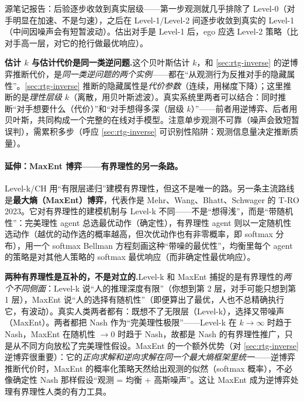 \noindent 源笔记报告：后验逐步收敛到真实层级——第一步观测就几乎排除了 Level-0（对手明显在加速、不是匀速），之后在 Level-1/Level-2 间逐步收敛到真实的 Level-1（中间因噪声会有短暂波动）\cite{camerer2004cognitive}。估出对手是 Level-1 后，ego 应选 Level-2 策略（比对手高一层，对它的抢行做最优响应）。

\begin{insight}
\textbf{估计 $k$ 与估计代价是同一类逆问题.}\;这个贝叶斯估计 $k$，和 \cref{sec:rtg-inverse} 的逆博弈推断代价，是\emph{同一类逆问题的两个实例}——都在“从观测行为反推对手的隐藏属性”。\cref{sec:rtg-inverse} 推断的隐藏属性是\emph{代价参数}（连续，用梯度下降）；这里推断的是\emph{理性层级 $k$}（离散，用贝叶斯滤波）。真实系统里两者可以结合：同时推断“对手想要什么（代价）”和“对手想得多深（层级 $k$）”——前者用逆博弈、后者用贝叶斯，共同构成一个完整的在线对手模型。注意单步观测不可靠（噪声会致短暂误判），需累积多步（呼应 \cref{sec:rtg-inverse} 可识别性陷阱：观测信息量决定推断质量）。
\end{insight}

\paragraph{延伸：MaxEnt 博弈——有界理性的另一条路。}
Level-k/CH 用“有限层递归”建模有界理性，但这不是唯一的路。另一条主流路线是\textbf{最大熵（MaxEnt）博弈}，代表作是 Mehr、Wang、Bhatt、Schwager 的 T-RO 2023\cite{mehr2023maximum}。它对有界理性的建模机制与 Level-k 不同——不是“想得浅”，而是“带随机性”：完美理性 agent 总选最优动作（确定性），有界理性 agent 则以一定随机性选动作（越优的动作选的概率越高，但次优动作也有非零概率，即 softmax 分布），用一个 softmax Bellman 方程刻画这种“带噪的最优性”，均衡里每个 agent 的策略是对其他人策略的 softmax 最优响应（而非确定性最优响应）。

\begin{insight}
\textbf{两种有界理性是互补的，不是对立的.}\;Level-k 和 MaxEnt 捕捉的是有界理性的\emph{两个不同侧面}：Level-k 说“人的推理深度有限”（你想到第 2 层，对手可能只想到第 1 层），MaxEnt 说“人的选择有随机性”（即便算出了最优，人也不总精确执行它，有波动）。真实人类两者都有：既想不了无限层（Level-k），选择又带噪声（MaxEnt）。两者都把 Nash 作为“完美理性极限”——Level-k 在 $k\to\infty$ 时趋于 Nash，MaxEnt 在随机性 $\to0$ 时趋于 Nash，故都是 Nash 的有界理性推广，只是从不同方向放松了完美理性假设。MaxEnt 的一个额外优势（对 \cref{sec:rtg-inverse} 逆博弈很重要）：它的\emph{正向求解和逆向求解在同一个最大熵框架里统一}——逆博弈推断代价时，MaxEnt 的概率化策略天然给出观测的似然（softmax 概率），不必像确定性 Nash 那样假设“观测 = 均衡 + 高斯噪声”。这让 MaxEnt 成为逆博弈处理有界理性人类的有力工具。
\end{insight}

